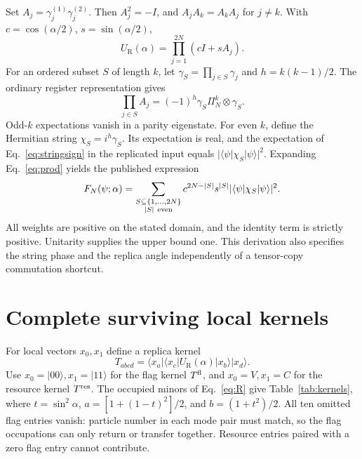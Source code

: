 \documentclass[aps,pra,reprint,amsmath,amssymb,longbibliography,floatfix]{revtex4-2}
\newcommand{\ket}[1]{\lvert #1\rangle}
\newcommand{\bra}[1]{\langle #1\rvert}
\newcommand{\twist}{U_{\mathrm R}}
\newcommand{\Ftw}{F}
\begin{document}
Set \(A_j=\gamma_j^{(1)}\gamma_j^{(2)}\). Then
\(A_j^2=-I\), and \(A_jA_k=A_kA_j\) for \(j\ne k\).
With \(c=\cos(\alpha/2)\), \(s=\sin(\alpha/2)\),
\begin{equation}
 \twist(\alpha)=\prod_{j=1}^{2N}(cI+sA_j).
 \label{eq:prod}
\end{equation}
For an ordered subset \(S\) of length \(k\), let
\(\gamma_S=\prod_{j\in S}\gamma_j\) and \(h=k(k-1)/2\).
The ordinary register representation gives
\begin{equation}
 \prod_{j\in S}A_j=(-1)^h
                   \gamma_S\Pi_N^k\otimes\gamma_S.
 \label{eq:stringsign}
\end{equation}
Odd-\(k\) expectations vanish in a parity eigenstate.
For even \(k\), define the Hermitian string
\(\chi_S=i^h\gamma_S\). Its expectation is real, and the
expectation of Eq.~\eqref{eq:stringsign} in the replicated
input equals \(\lvert\bra\psi\chi_S\ket\psi\rvert^2\).
Expanding Eq.~\eqref{eq:prod} yields the published expression
\cite{SunZhang2026}
\begin{equation}
 \Ftw_N(\psi;\alpha)=
 \sum_{\substack{S\subseteq\{1,\ldots,2N\}\\ |S|\ {\rm even}}}
 c^{2N-|S|}s^{|S|}
       \lvert\bra\psi\chi_S\ket\psi\rvert^2 .
 \label{eq:strings}
\end{equation}
All weights are positive on the stated domain, and the identity
term is strictly positive. Unitarity supplies the upper bound one.
This derivation also specifies the string phase and the replica
angle independently of a tensor-copy commutation shortcut.

\section{Complete surviving local kernels}
\label{app:kernels}

For local vectors \(x_0,x_1\) define a replica kernel
\begin{equation}
 T_{abcd}=\bra{x_a}\bra{x_c}\twist(\alpha)
                   \ket{x_b}\ket{x_d}.
 \label{eq:T}
\end{equation}
Use \(x_0=\ket{00},x_1=\ket{11}\) for the flag kernel \(T^{\rm fl}\),
and \(x_0=V,x_1=C\) for the resource kernel \(T^{\rm res}\).
The occupied minors of Eq.~\eqref{eq:R} give
Table~\ref{tab:kernels}, where \(t=\sin^2\alpha\),
\(a=[1+(1-t)^2]/2\), and \(b=(1+t^2)/2\).
All ten omitted flag entries vanish: particle number in each
mode pair must match, so the flag occupations can only return
or transfer together. Resource entries paired with a zero
flag entry cannot contribute.
\end{document}
